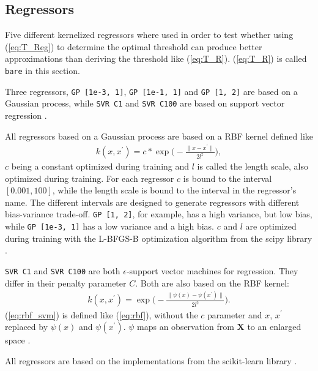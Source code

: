 \documentclass[twoside,11pt]{article}
\def\X{\textbf{X}}
\begin{document}

\subsection{Regressors}

Five different kernelized regressors where used in order
to test whether using (\ref{eq:T_Reg}) to determine the
optimal threshold can produce better approximations than
deriving the threshold like (\ref{eq:T_R}).
(\ref{eq:T_R}) is called \texttt{bare} in this section.

Three regressors, \texttt{GP [1e-3, 1]},
\texttt{GP [1e-1, 1]} and \texttt{GP [1, 2]} are based on
a Gaussian process, while \texttt{SVR C1} and
\texttt{SVR C100} are based on support vector regression
\citep[see e.g.][Chapters 14, 15]{murphy_2012}.

All regressors based on a Gaussian process are based on
a RBF kernel defined like
\begin{align}
  \label{eq:rbf}
  k(x, x^\prime) = c * \exp \bigg(
    -\frac{\| x - x^\prime \|}{2l^2} \bigg),
\end{align}
$c$ being a constant optimized during training and $l$ is
called the length scale, also optimized during training.
For each regressor $c$ is bound to the interval
$[0.001, 100]$, while the length scale is bound to the
interval in the regressor's name.
The different intervals are designed to generate regressors
with different bias-variance trade-off.
\texttt{GP [1, 2]}, for example, has a high variance, but
low bias, while \texttt{GP [1e-3, 1]} has a low variance
and a high bias.
$c$ and $l$ are optimized during training with the
L-BFGS-B optimization algorithm from the scipy library
\citep[see][]{zhu_et_al_1997, scipy}.

\texttt{SVR C1} and \texttt{SVR C100} are both
$\epsilon$-support vector machines for regression.
They differ in their penalty parameter $C$.
Both are also based on the RBF kernel:
\begin{align}
  \label{eq:rbf_svm}
  k(x, x^\prime) = \exp \bigg(
    -\frac{\| \psi(x) - \psi(x^\prime) \|}{2l^2} \bigg).
\end{align}
(\ref{eq:rbf_svm}) is defined like (\ref{eq:rbf}),
without the $c$ parameter and $x$, $x^\prime$ replaced by
$\psi(x)$ and $\psi(x^\prime)$.
$\psi$ maps an observation from $\X$ to an enlarged space
\citep[see][Chapter 12.3]{hastie_et_al_2009}.

All regressors are based on the implementations from
the scikit-learn library \citep[see][]{sklearn_api}.
\end{document}
